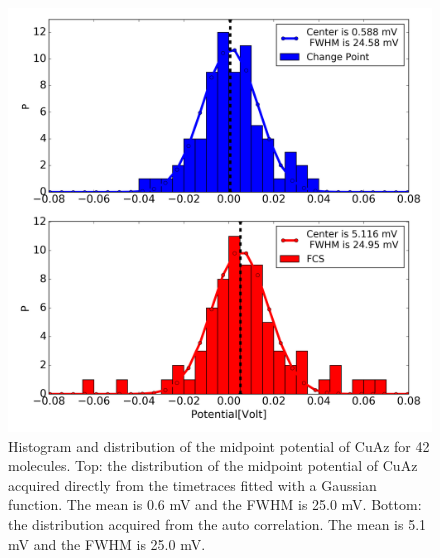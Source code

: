 \documentclass[twoside,single]{lion-msc}
\begin{document}
\begin{figure}[ht!]
\centering
\includegraphics[width=\textwidth]{midpointhistograms}
\caption{Histogram and distribution of the midpoint potential of CuAz for 42 molecules. Top: the distribution of the midpoint potential of CuAz acquired directly from the timetraces fitted with a Gaussian function. The mean is 0.6 mV and the FWHM is 25.0 mV. Bottom: the distribution acquired from the auto correlation. The mean is 5.1 mV and the FWHM is 25.0 mV.}
\label{t_ratio_plot}
\end{figure}



\end{document}
